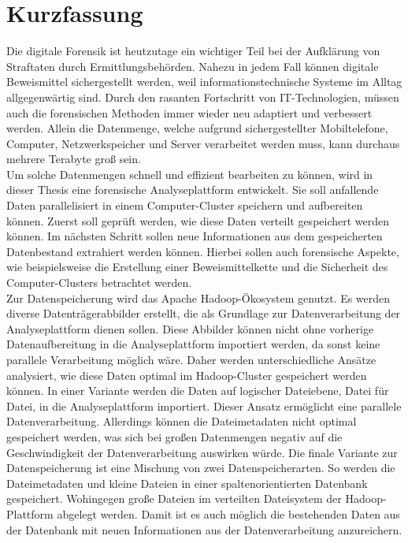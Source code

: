 %
\section*{Kurzfassung}
Die digitale Forensik ist heutzutage ein wichtiger Teil bei der Aufklärung von Straftaten durch Ermittlungsbehörden. Nahezu in jedem Fall können digitale Beweismittel sichergestellt werden, weil informationstechnische Systeme im Alltag allgegenwärtig sind. Durch den rasanten Fortschritt von IT-Technologien, müssen auch die forensischen Methoden immer wieder neu adaptiert und verbessert werden. Allein die Datenmenge, welche aufgrund sichergestellter Mobiltelefone, Computer, Netzwerkspeicher und Server verarbeitet werden muss, kann durchaus mehrere Terabyte groß sein.\\
Um solche Datenmengen schnell und effizient bearbeiten zu können, wird in dieser Thesis eine forensische Analyseplattform entwickelt. Sie soll anfallende Daten parallelisiert in einem Computer-Cluster speichern und aufbereiten können. Zuerst soll geprüft werden, wie diese Daten verteilt gespeichert werden können. Im nächsten Schritt sollen neue Informationen aus dem gespeicherten Datenbestand extrahiert werden können. Hierbei sollen auch forensische Aspekte, wie beispielsweise die Erstellung einer Beweismittelkette und die Sicherheit des Computer-Clusters betrachtet werden.\\

\noindent
Zur Datenspeicherung wird das Apache Hadoop\textsuperscript{\textregistered}-Ökosystem genutzt. Es werden diverse Datenträgerabbilder erstellt, die als Grundlage zur Datenverarbeitung der Analyseplattform dienen sollen. Diese Abbilder können nicht ohne vorherige Datenaufbereitung in die Analyseplattform importiert werden, da sonst keine parallele Verarbeitung möglich wäre. Daher werden unterschiedliche Ansätze analysiert, wie diese Daten optimal im Hadoop-Cluster gespeichert werden können. In einer Variante werden die Daten auf logischer Dateiebene, Datei für Datei, in die Analyseplattform importiert. Dieser Ansatz ermöglicht eine parallele Datenverarbeitung. Allerdings können die Dateimetadaten nicht optimal gespeichert werden, was sich bei großen Datenmengen negativ auf die Geschwindigkeit der Datenverarbeitung auswirken würde.
Die finale Variante zur Datenspeicherung ist eine Mischung von zwei Datenspeicherarten. So werden die Dateimetadaten und kleine Dateien in einer spaltenorientierten Datenbank gespeichert. Wohingegen große Dateien im verteilten Dateisystem der Hadoop-Plattform abgelegt werden. Damit ist es auch möglich die bestehenden Daten aus der Datenbank mit neuen Informationen aus der Datenverarbeitung anzureichern.\\

